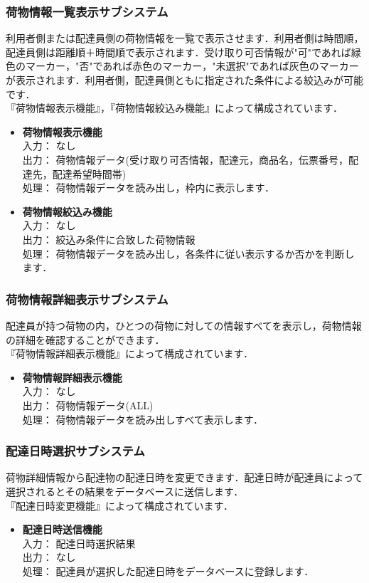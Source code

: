 \documentclass[a4j,titlepage]{jarticle}
\begin{document}
\subsubsection{荷物情報一覧表示サブシステム}
利用者側または配達員側の荷物情報を一覧で表示させます．利用者側は時間順，配達員側は距離順＋時間順で表示されます．受け取り可否情報が"可"であれば緑色のマーカー，"否"であれば赤色のマーカー，"未選択"であれば灰色のマーカーが表示されます．利用者側，配達員側ともに指定された条件による絞込みが可能です．\\
『荷物情報表示機能』，『荷物情報絞込み機能』によって構成されています．
\begin{itemize}
\item \textbf{荷物情報表示機能} \\
入力： なし \\
出力： 荷物情報データ(受け取り可否情報，配達元，商品名，伝票番号，配達先，配達希望時間帯)  \\
処理： 荷物情報データを読み出し，枠内に表示します．
\item \textbf{荷物情報絞込み機能} \\
入力： なし \\
出力： 絞込み条件に合致した荷物情報 \\
処理： 荷物情報データを読み出し，各条件に従い表示するか否かを判断します．
\end{itemize}

\subsubsection{荷物情報詳細表示サブシステム}
配達員が持つ荷物の内，ひとつの荷物に対しての情報すべてを表示し，荷物情報の詳細を確認することができます．\\
『荷物情報詳細表示機能』によって構成されています．
\begin{itemize}
\item \textbf{荷物情報詳細表示機能} \\
入力： なし \\
出力： 荷物情報データ(ALL) \\
処理： 荷物情報データを読み出しすべて表示します．
\end{itemize}


\subsubsection{配達日時選択サブシステム}
荷物詳細情報から配達物の配達日時を変更できます．配達日時が配達員によって選択されるとその結果をデータベースに送信します．\\
『配達日時変更機能』によって構成されています．
\begin{itemize}
\item \textbf{配達日時送信機能} \\
入力： 配達日時選択結果\\
出力： なし \\
処理： 配達員が選択した配達日時をデータベースに登録します．
\end{itemize}
\end{document}
